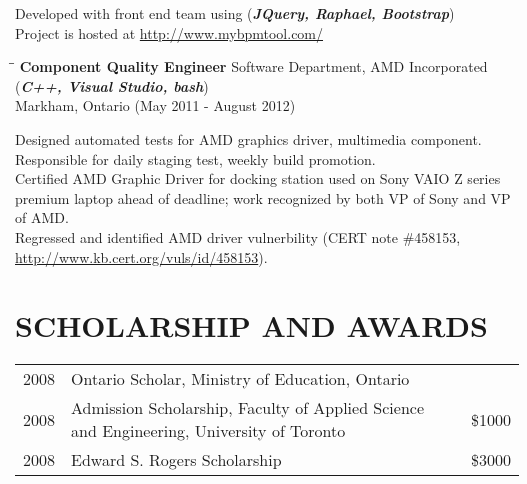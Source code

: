 \documentclass{res}
\begin{document}
\begin{resume}
    Developed with front end team using (\textbf{\textit{JQuery, Raphael, Bootstrap}})\\
    Project is hosted at \url{http://www.mybpmtool.com/}
   \begin{tabbing}
   \hspace{2.3in}\= \hspace{2.6in}\= \kill %
   {\bf Component Quality Engineer} \>Software Department, AMD Incorporated (\textbf{\textit{C++, Visual Studio, bash}})\>\\
                             \>Markham, Ontario (May 2011 - August 2012)
   \end{tabbing}
   \vspace{-20pt}      %
    Designed automated tests for AMD graphics driver, multimedia component.\\
    Responsible for daily staging test, weekly build promotion.\\
    Certified AMD Graphic Driver for docking station used on Sony VAIO Z series premium laptop
    ahead of deadline; work recognized by both VP of Sony and VP of AMD.\\
    Regressed and identified AMD driver vulnerbility (CERT note \#458153,
    \url{http://www.kb.cert.org/vuls/id/458153}).

\section{SCHOLARSHIP AND AWARDS}          
    \begin{tabular} {l l r}
      2008 & Ontario Scholar, Ministry of Education, Ontario & \\
      2008 & Admission Scholarship, Faculty of Applied Science and Engineering, University of Toronto & \$1000 \\
      2008 & Edward S. Rogers Scholarship & \$3000 \\
    \end{tabular}

\end{resume}
\end{document}
